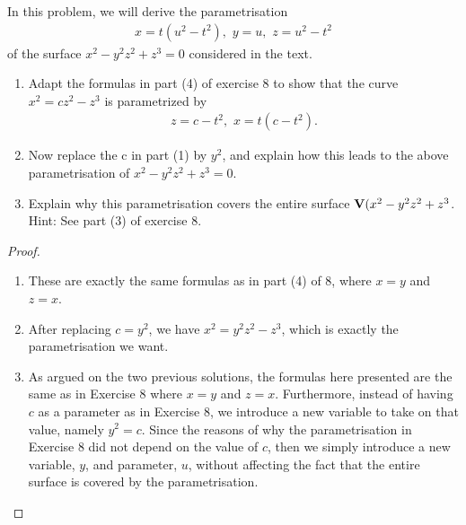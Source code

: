 \begin{exercise}{11}
In this problem, we will derive the parametrisation
\begin{align*}
    x = t(u^2-t^2),\,\, y = u,\,\, z = u^2-t^2
\end{align*}
of the surface $x^2-y^2z^2+z^3=0$ considered in the text.
\begin{enumerate}
    \item Adapt the formulas in part (4) of exercise 8 to show that the curve $x^2 = cz^2-z^3$ is parametrized by 
    \begin{align*}
        z=c-t^2,\,\, x=t(c-t^2).
    \end{align*}
    \item Now replace the c in part (1) by $y^2$, and explain how this leads to the above parametrisation of $x^2-y^2z^2+z^3=0$.
    \item Explain why this parametrisation covers the entire surface $\mathbf{V}(x^2-y^2z^2+z^3$. Hint: See part (3) of exercise 8.
\end{enumerate}
\end{exercise}
\begin{proof}
\begin{enumerate}
    \item These are exactly the same formulas as in part (4) of 8, where $x=y$ and $z=x$. 
    \item After replacing $c=y^2$, we have $x^2=y^2z^2-z^3$, which is exactly the parametrisation we want.
    \item As argued on the two previous solutions, the formulas here presented are the same as in Exercise 8 where $x=y$ and $z=x$. 
    Furthermore, instead of having $c$ as a parameter as in Exercise 8, we introduce a new variable to take on that value, namely $y^2=c$. 
    Since the reasons of why the parametrisation in Exercise 8 did not depend on the value of $c$, then we simply introduce a new variable, $y$, and parameter, $u$, without affecting the fact that the entire surface is covered by the parametrisation.
\end{enumerate}
\end{proof}

